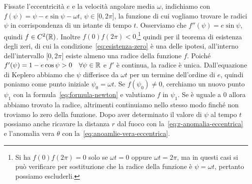 Fissate l'eccentricità $e$ e la velocità angolare media $\omega$, indichiamo con
$f(\psi) = \psi -e\sin\psi-\omega t$, $\psi\in\mathopen{[}0, 2\pi\mathclose{]}$,
la funzione di cui vogliamo trovare le radici $\psi$ in corrispondenza di un
istante di tempo $t$. Osserviamo che $f''(\psi) = e\sin\psi$, quindi
$f\in C^2(\mathbb{R})$. Inoltre $f(0)f(2\pi) <
0$,\footnote{Si
  ha $f(0)f(2\pi) = 0$ solo se $\omega t = 0$ oppure $\omega t = 2\pi$, ma in
  questi casi si può verificare per sostituzione che la radice della funzione è
  $\psi = \omega t$, pertanto possiamo escluderli.}
quindi per il teorema di esistenza degli zeri, di cui la
condizione~\eqref{eq:esistenza-zero} è una delle ipotesi, all'interno
dell'intervallo $\mathopen{[}0, 2\pi\mathclose{]}$ esiste almeno una radice
della funzione $f$. Poiché
$f'(\psi) = 1 - e\cos\psi > 0 \quad \forall \psi\in\mathbb{R}$ e $f'$ è continua, la
radice è unica. Dall'equazione di Keplero abbiamo che $\psi$ differisce da
$\omega t$ per un termine dell'ordine di $e$, quindi poniamo come punto iniziale
$\psi_0 = \omega t$. Se $f(\psi_0)\neq 0$, cerchiamo un nuovo punto $\psi_1$ con
la formula~\eqref{eq:formula-newton} e valutiamo $f$ in $\psi_1$. Se è uguale a
$0$ allora abbiamo trovato la radice, altrimenti continuiamo nello stesso modo
finché non troviamo lo zero della funzione. Dopo aver determinato il valore di
$\psi$ al tempo $t$ possiamo anche ricavare la distanza $r$ dal fuoco con
la~\eqref{eq:r-anomalia-eccentrica} e l'anomalia vera $\theta$ con
la~\eqref{eq:anoamlie-vera-eccentrica}.

